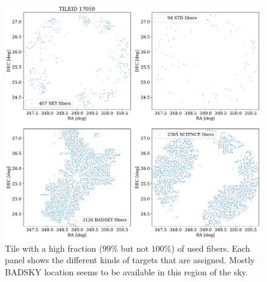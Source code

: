 \documentclass{article}
\begin{document}
\begin{figure}[!h]
\begin{center}
\begin{center}
\includegraphics[scale=0.40]{single_tile_17059.pdf}
\end{center}
\caption{Tile with a high fraction ($99\%$ but not $100\%$) of used fibers.
Each panel shows the different kinds of targets that are
assigned. 
Mostly BADSKY location seems to be available in this region of the
sky. 
\label{fig:tile_high_fraction}}
\end{center}
\end{figure}
\end{document}
